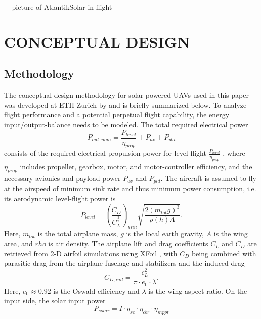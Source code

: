 \documentclass[letterpaper, 10 pt, conference]{ieeeconf}  %
\begin{document}
+ picture of AtlantikSolar in flight

\section{CONCEPTUAL DESIGN}
\subsection{Methodology} \label{sec:ConceptualDesignMethodology}
The conceptual design methodology for solar-powered UAVs used in this paper was developed at ETH Zurich by \cite{Noth_PhD,Leutenegger_JIRS} and is briefly summarized below. To analyze flight performance and a potential perpetual flight capability, the energy input/output-balance needs to be modeled. The total required electrical power
\begin{equation} \label{eqn:P_out}
P_{out,nom}=\frac{P_{level}}{\eta_{prop}}+P_{av}+P_{pld}
\end{equation}
consists of the required electrical propulsion power for level-flight $\frac{P_{level}}{\eta_{prop}}$ , where $\eta_{prop}$ includes propeller, gearbox, motor, and motor-controller efficiency, and the necessary avionics and payload power $P_{av}$ and $P_{pld}$. The aircraft is assumed to fly at the airspeed of minimum sink rate and thus minimum power consumption, i.e. its aerodynamic level-flight power is
\begin{equation} \label{eqn:P_level}
P_{level}=\left(\frac{C_D}{C_L^\frac{3}{2}}\right)_{min}\sqrt{\frac{2(m_{tot}g)^3}{\rho(h)A}} .
\end{equation}
Here, $m_{tot}$ is the total airplane mass, $g$ is the local earth gravity, $A$ is the wing area, and $rho$ is air density. The airplane lift and drag coefficients $C_L$ and $C_D$ are retrieved from 2-D airfoil simulations using XFoil \cite{Drela_XFoil}, with $C_D$ being combined with parasitic drag from the airplane fuselage and stabilizers and the induced drag  
\begin{equation} \label{eqn:C_D}
C_{D,ind}=\frac{c_L^2}{\pi\cdot e_0\cdot\lambda} .
\end{equation}
Here, $e_0\approx0.92$ is the Oswald efficiency and $\lambda$ is the wing aspect ratio. On the input side, the solar input power
\begin{equation} \label{eqn:P_solar}
P_{solar}=I\cdot\eta_{sc}\cdot\eta_{cbr}\cdot\eta_{mppt}
\end{equation}
\end{document}
